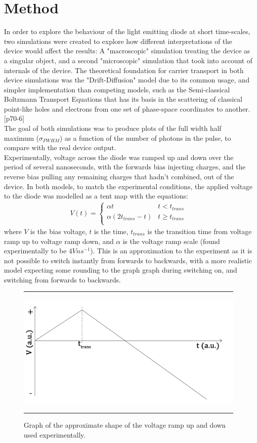 \documentclass[titlepage]{article}
\begin{document}
\section{Method}
In order to explore the behaviour of the light emitting diode at short time-scales, two simulations were created to explore how different interpretations of the device would affect the results: A "macroscopic" simulation treating the device as a singular object, and a second "microscopic" simulation that took into account of internals of the device. The theoretical foundation for carrier transport in both device simulations was the "Drift-Diffusion" model due to its common usage, and simpler implementation than competing models, such as the Semi-classical Boltzmann Transport Equations that has its basis in the scattering of classical point-like holes and electrons from one set of phase-space coordinates to another.\cite{NSD}[p70-6] \\
The goal of both simulations was to produce plots of the full width half maximum ($\sigma_{FWHM}$) as a function of the number of photons in the pulse, to compare with the real device output.\\
Experimentally, voltage across the diode was ramped up and down over the period of several nanoseconds, with the forwards bias injecting charges, and the reverse bias pulling any remaining charges that hadn't combined, out of the device. In both models, to match the experimental conditions, the applied voltage to the diode was modelled as a tent map with the equations:
\begin{eqnarray}
	V(t) = \begin{cases}
	\alpha t &t < t_{trans}\\
	\alpha(2t_{trans} - t) &t \geq t_{trans}\\
	\end{cases}
\end{eqnarray}
where $V$ is the bias voltage, $t$ is the time, $t_{trans}$ is the transition time from voltage ramp up to voltage ramp down, and $\alpha$ is the voltage ramp scale (found experimentally to be $4Vns^{-1}$). This is an approximation to the experiment as it is not possible to switch instantly from forwards to backwards, with a more realistic model expecting some rounding to the graph graph during switching on, and switching from forwards to backwards. 
\begin{figure}[t]
	\hrule
	\centering
	\includegraphics[scale=0.12]{Figures/V_tent}
	\caption{\label{graph:V_tent}Graph of the approximate shape of the voltage ramp up and down used experimentally.}
	\hrule
\end{figure}
\end{document}
